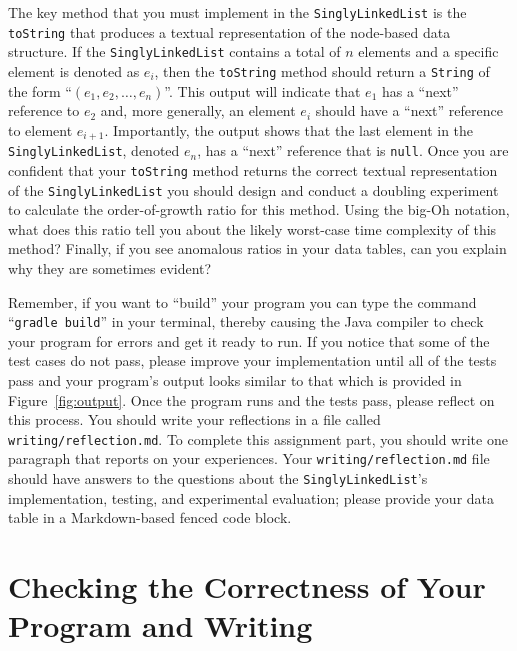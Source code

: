 \documentclass[11pt]{article}
\newcommand{\reflection}{\lstinline{writing/reflection.md}}
\newcommand{\gradlebuild}{\command{gradle build}}
\newcommand{\command}[1]{``\lstinline{#1}''}
\newcommand{\program}[1]{\lstinline{#1}}
\newcommand{\step}[1]{``{#1}''}
\begin{document}
The key method that you must implement in the \program{SinglyLinkedList} is the
\program{toString} that produces a textual representation of the node-based data
structure. If the \program{SinglyLinkedList} contains a total of $n$ elements
and a specific element is denoted as $e_i$, then the \program{toString} method
should return a \program{String} of the form ``$(e_1, e_2, \ldots, e_n)$''. This
output will indicate that $e_1$ has a ``next'' reference to $e_2$ and, more
generally, an element $e_i$ should have a ``next'' reference to element
$e_{i+1}$. Importantly, the output shows that the last element in the
\program{SinglyLinkedList}, denoted $e_n$, has a ``next'' reference that is
\program{null}. Once you are confident that your \program{toString} method
returns the correct textual representation of the \program{SinglyLinkedList} you
should design and conduct a doubling experiment to calculate the order-of-growth
ratio for this method. Using the big-Oh notation, what does this ratio tell you
about the likely worst-case time complexity of this method? Finally, if you see
anomalous ratios in your data tables, can you explain why they are sometimes
evident?

Remember, if you want to \step{build} your program you can type the command
\gradlebuild{} in your terminal, thereby causing the Java compiler to check your
program for errors and get it ready to run. If you notice that some of the test
cases do not pass, please improve your implementation until all of the tests
pass and your program's output looks similar to that which is provided in
Figure~\ref{fig:output}. Once the program runs and the tests pass, please
reflect on this process. You should write your reflections in a file called
\reflection{}. To complete this assignment part, you should write one paragraph
that reports on your experiences. Your \reflection{} file should have answers to
the questions about the \program{SinglyLinkedList}'s implementation, testing,
and experimental evaluation; please provide your data table in a Markdown-based
fenced code block.

\section*{Checking the Correctness of Your Program and Writing}
\end{document}
